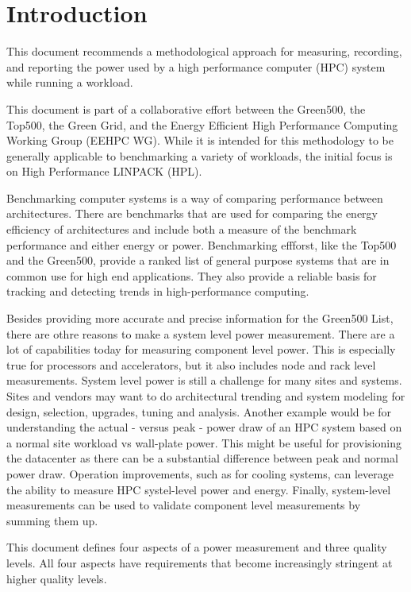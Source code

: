 \chapter{Introduction}
\label{sec:intro}

\noindent
This document recommends a methodological approach for measuring, recording, and reporting the power used by a high performance computer (HPC) system while running a workload.
\wl

\noindent
This document is part of a collaborative effort between the Green500, the Top500, the Green Grid, and the Energy Efficient High Performance Computing Working Group (EEHPC WG).
While it is intended for this methodology to be generally applicable to benchmarking a variety of workloads, the initial focus is on High Performance LINPACK (HPL).
\wl

\noindent
Benchmarking computer systems is a way of comparing performance between architectures. There are benchmarks that are used for comparing the energy efficiency of architectures
and include both a measure of the benchmark performance and either energy or power. Benchmarking effforst, like the Top500 and the Green500, provide a ranked list of general purpose
systems that are in common use for high end applications. They also provide a reliable basis for tracking and detecting trends in high-performance computing.
\wl

\noindent
Besides providing more accurate and precise information for the Green500 List, there are othre reasons to make a system level power measurement. There are a lot of capabilities today 
for measuring component level power. This is especially true for processors and accelerators, but it also includes node and rack level measurements. System level power is still a 
challenge for many sites and systems. Sites and vendors may want to do architectural trending and system modeling for design, selection, upgrades, tuning and analysis.
Another example would be for understanding the actual - versus peak - power draw of an HPC system based on a normal site workload vs wall-plate power. This might be useful for 
provisioning the datacenter as there can be a substantial difference between peak and normal power draw. Operation improvements, such as for cooling systems, can leverage the 
ability to measure HPC systel-level power and energy. Finally, system-level measurements can be used to validate component level measurements by summing them up.
\wl

\pagebreak
\noindent
This document defines four aspects of a power measurement and three quality levels.
All four aspects have requirements that become increasingly stringent at higher quality levels. 
\wl


